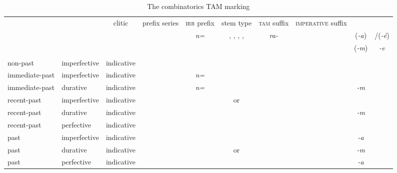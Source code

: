 \begin{sidewaystable}
	\caption{The combinatorics TAM marking}
	\label{TAMpalooza1}
\begin{tabularx}{\textwidth}{lllc|c|c|c|c|c|c|}
	\lsptoprule
	\multicolumn{3}{c}{\multirow{3}{*}{\textsc{tam} value}}	&\multicolumn{1}{c}{}&\multicolumn{1}{c}{clitic} &\multicolumn{1}{c}{prefix series}&\multicolumn{1}{c}{\textsc{irr} prefix}&\multicolumn{1}{c}{stem type}&\multicolumn{1}{c}{\textsc{tam} suffix}&\multicolumn{1}{c}{\textsc{imperative} suffix}\\
	&&&\multicolumn{1}{c}{}&\multicolumn{1}{c}{\emph{n=}}&\multicolumn{1}{c}{\Alph, \Bet, \Betaone, \Betatwo, \Gam}&\multicolumn{1}{c}{\emph{ra-}}&\multicolumn{1}{c}{{\Ext}}&\multicolumn{1}{c}{\Pst{} (\emph{-a})}&\multicolumn{1}{c}{{\Imp}/\Ssg (\emph{-é})}\\
	&&&\multicolumn{1}{c}{}&\multicolumn{1}{c}{}&\multicolumn{1}{c}{}&\multicolumn{1}{c}{}&\multicolumn{1}{c}{{\Rs}}&\multicolumn{1}{c}{\Dur{} (\emph{-m})}&\multicolumn{1}{c}{\Snsg \emph{-e}}\\\midrule
	\multicolumn{9}{c}{}\\\cline{6-6}\cline{8-8}
	non-past &imperfective&indicative&\multicolumn{1}{c}{}&&\Alph{}&&\Ext&\multicolumn{2}{c}{}\\\cline{5-6}\cline{8-8}
	immediate-past &imperfective&indicative&&\emph{n=}&\Alph{}&&\Ext&\multicolumn{2}{c}{}\\\cline{5-6}\cline{8-9}
	immediate-past &durative&indicative&&\emph{n=}&\Alph{}&&\Ext&\emph{-m}&\multicolumn{1}{c}{}\\\cline{5-6}\cline{8-9}
	recent-past &imperfective&indicative&\multicolumn{1}{c}{}&&\Betaone{} or \Betatwo&&\Ext&\multicolumn{2}{c}{}\\\cline{6-6}\cline{8-9}
	recent-past &durative&indicative&\multicolumn{1}{c}{}&&\Alph&&\Ext&\emph{-m}&\multicolumn{1}{c}{}\\\cline{6-6}\cline{8-9}
	recent-past &perfective&indicative&\multicolumn{1}{c}{}&&\Gam{}&&\Rs&\multicolumn{2}{c}{}\\\cline{6-6}\cline{8-9}
	past &imperfective&indicative&\multicolumn{1}{c}{}&&\Alph&&\Ext&\emph{-a}&\multicolumn{1}{c}{}\\\cline{6-6}\cline{8-9}
	past &durative&indicative&\multicolumn{1}{c}{}&&\Betaone{} or \Betatwo&&\Ext&\emph{-m}&\multicolumn{1}{c}{}\\\cline{6-6}\cline{8-9}
	past &perfective&indicative&\multicolumn{1}{c}{}&&\Gam&&\Rs&\emph{-a}&\multicolumn{1}{c}{}\\\cline{6-6}\cline{8-9}

\end{tabularx}
\end{sidewaystable}
